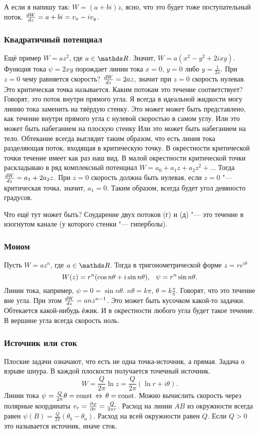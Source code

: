 А если я напишу так: $W = (a + bi)z$, ясно, что это будет тоже поступательный поток. $\frac{dW}{dz} = a+bi = v_x - i v_y$. 
\subsubsection{Квадратичный потенциал}
Ещё пример $W = az^2$, где $a\in\R$. Значит, $W = a(x^2-y^2 + 2ixy)$. Функция тока $\psi = 2xy$ порождает линии тока $x=0$, $y=0$ либо $y = \frac1{2x}$.
При $z=0$ чему равняется скорость? $\frac{dW}{dz} = 2az$, значит при $z=0$ скорость нулевая. Это критическая точка называется. Каким потокам это течение соответствует? Говорят, это поток внутри прямого угла. Я всегда в идеальной жидкости могу линию тока заменить на твёрдую стенку. Это может может быть представлено, как течение внутри прямого угла с нулевой скоростью в самом углу.
Или это может быть набеганием на плоскую стенку
Или это может быть набеганием на тело. Обтекание всегда выглядит таким образом, что есть линия тока разделяющая поток, входящая в критическую точку. В окрестности критической точки течение имеет как раз наш вид.
В малой окрестности критической точки раскладываю в ряд комплексный потенциал $W = a_0 + a_1 z + a_2 z^2 + \dots$ Тогда $\frac{dW}{dz} = a_1 + 2a_2 z$. При $z=0$ скорость должна быть нулевая, если $z=0$ "--- критическая точка, значит, $a_1=0$. Таким образом, всегда будет угол девяносто градусов.

Что ещё тут может быть? Соударение двух потоков (г) и (д) "--- это течение в изогнутом канале (у которого стенки "--- гиперболы).

\subsubsection{Моном}
Пусть $W = a z^n$, где $a\in\R$. Тогда в тригонометрической форме $z = r e^{i\theta}$
\[
  W(z) = r^n(\cos n\theta + i \sin n\theta),\hskip .75em plus.1em minus.08em\relax \psi = r^n\sin n\theta.
\]
Линии тока, например, $\psi = 0 = \sin n\theta$. $n\theta = k\pi$, $\theta= k\frac\pi n$.
Говорят, что это течение вне угла. При этом $\frac{dW}{dz} = a n z^{n-1}$. Это может быть кусочком какой-то задачки. Обтекается какой-нибудь ёжик. И в окрестности любого угла будет такое течение. В вершине угла  всегда скорость ноль.
\subsubsection{Источник или сток}
Плоские задачи означают, что есть не одна точка-источник, а прямая. Задача о взрыве шнура. В каждой плоскости получается точечный источник. 
\[
  W = \frac{Q}{2\pi}\ln z = \frac Q{2\pi}(\ln r + i\theta).
\]
Линии тока $\psi = \frac Q{2\pi} \theta=\operatorname{const}\,\Leftrightarrow\, \theta = \operatorname{const}$. Можно вычислить скорость через полярные координаты $v_r = \frac{\partial \varphi}{\partial r} = \frac Q{2\pi r}$.
Расход на линии $AB$ из окружности всегда равен $\psi(B) =\frac Q{2\pi}(\theta_b-\theta_a)$. Расход на всей окружности равен $Q$. Если $Q>0$ это называется источник, иначе сток.

